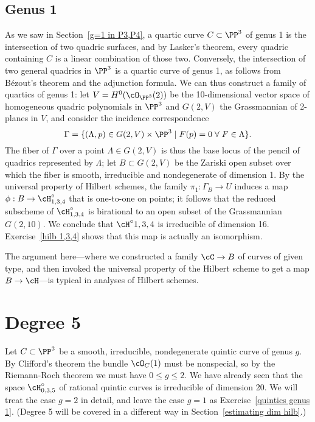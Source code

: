 \subsection{Genus 1}
 As we saw in Section~\ref{g=1 in P3,P4}, a quartic curve $C \subset \PP^3$ of genus 1 is the intersection of two quadric surfaces, and by Lasker's theorem, every quadric containing $C$ is a linear combination of those two. Conversely, the intersection of two general quadrics in $\PP^3$ is a quartic curve of genus 1, as follows from B\'ezout's theorem and the adjunction formula. We can thus construct a family of quartics of genus 1: let $V = H^0(\cO_{\PP^3}(2))$ be the 10-dimensional vector space of homogeneous quadric polynomials in $\PP^3$ and $G(2,V)$ the Grassmannian of 2-planes in $V$, and consider the incidence correspondence
$$
\Gamma = \{ (\Lambda, p) \in G(2,V) \times \PP^3 \mid F(p)=0 \; \forall \; F \in \Lambda \}.
$$
The fiber of $\Gamma$ over a point $\Lambda \in G(2,V)$ is thus the base locus of the pencil of quadrics represented by $\Lambda$; let $B \subset G(2,V)$ be the Zariski open subset over which the fiber is smooth, irreducible and nondegenerate of dimension 1. By the universal property of Hilbert schemes, the family $\pi_1 : \Gamma_B \to U$ induces a map $\phi : B \to \cH^\circ_{1,3,4}$ that is one-to-one on points; it follows that the reduced subscheme of $\cH^\circ_{1,3,4}$ is birational to an open subset of the Grassmannian $G(2,10)$. We conclude that $\cH^\circ{1,3,4}$ is irreducible of dimension 16. Exercise~\ref{hilb 1,3,4} shows that this map is actually an isomorphism.

The  argument  here---where we constructed a family $\cC \to B$ of curves of given type, and then invoked the universal property of the Hilbert scheme to get a map $B \to \cH$---is typical in analyses of Hilbert schemes. 

\section{Degree 5}

Let $C \subset \PP^3$ be a smooth, irreducible, nondegenerate quintic curve of genus $g$. By Clifford's theorem the bundle $\cO_C(1)$ must be nonspecial, so  by the Riemann-Roch theorem we must have $0\leq g \leq 2$. We have already seen that the space $\cH^\circ_{0,3,5}$ of rational quintic curves is irreducible of dimension 20. We will treat the case $g=2$ in detail, and leave the case $g=1$ as Exercise~\ref{quintics genus 1}. (Degree 5 will be covered in a different way in Section~\ref{estimating dim hilb}.)

